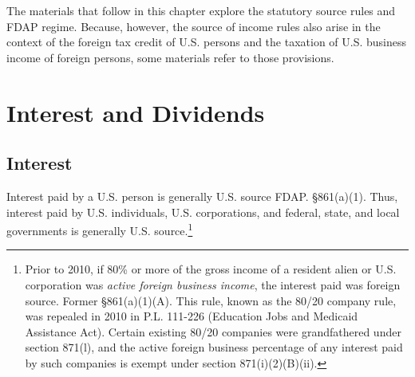 The materials that follow in this chapter explore the statutory source rules and FDAP regime.  Because, however, the source of income rules also arise in the context of the foreign tax credit of U.S. persons and the taxation of U.S. business income of foreign persons, some materials refer to those provisions.  

\section{Interest and Dividends}

	\subsection{Interest}

Interest paid by a U.S. person is generally U.S. source FDAP.  \S 861(a)(1).  Thus, interest paid by U.S. individuals, U.S. corporations, and federal, state, and local governments is generally U.S. source.\footnote{Prior to 2010, if 80\% or more of the gross income of a resident alien or U.S. corporation was \emph{active foreign business income}, the interest paid was foreign source.  Former \S861(a)(1)(A). This rule, known as the 80/20 company rule, was repealed in 2010 in P.L. 111-226 (Education Jobs and Medicaid Assistance Act).  Certain existing 80/20 companies were grandfathered under section 871(l), and the active foreign business percentage of any interest paid by such companies is exempt under section 871(i)(2)(B)(ii). }    


